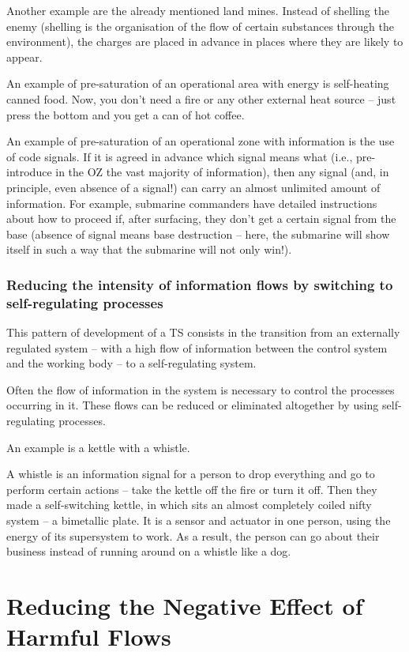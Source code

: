 \documentclass[a4paper,11pt]{article}
\begin{document}
Another example are the already mentioned land mines. Instead of shelling the
enemy (shelling is the organisation of the flow of certain substances through
the environment), the charges are placed in advance in places where they are
likely to appear.

An example of pre-saturation of an operational area with energy is
self-heating canned food. Now, you don't need a fire or any other external
heat source -- just press the bottom and you get a can of hot coffee.

An example of pre-saturation of an operational zone with information is the
use of code signals. If it is agreed in advance which signal means what (i.e.,
pre-introduce in the OZ the vast majority of information), then any signal
(and, in principle, even absence of a signal!) can carry an almost unlimited
amount of information. For example, submarine commanders have detailed
instructions about how to proceed if, after surfacing, they don't get a
certain signal from the base (absence of signal means base destruction --
here, the submarine will show itself in such a way that the submarine will not
only win!).

\subsubsection{Reducing the intensity of information flows by switching to
  self-regulating processes} 

This pattern of development of a TS consists in the transition from an
externally regulated system -- with a high flow of information between the
control system and the working body -- to a self-regulating system.

Often the flow of information in the system is necessary to control the
processes occurring in it. These flows can be reduced or eliminated altogether
by using self-regulating processes.

An example is a kettle with a whistle.

A whistle is an information signal for a person to drop everything and go to
perform certain actions -- take the kettle off the fire or turn it off. Then
they made a self-switching kettle, in which sits an almost completely coiled
nifty system -- a bimetallic plate. It is a sensor and actuator in one person,
using the energy of its supersystem to work. As a result, the person can go
about their business instead of running around on a whistle like a dog.

\section{Reducing the Negative Effect of Harmful Flows}
\end{document}
